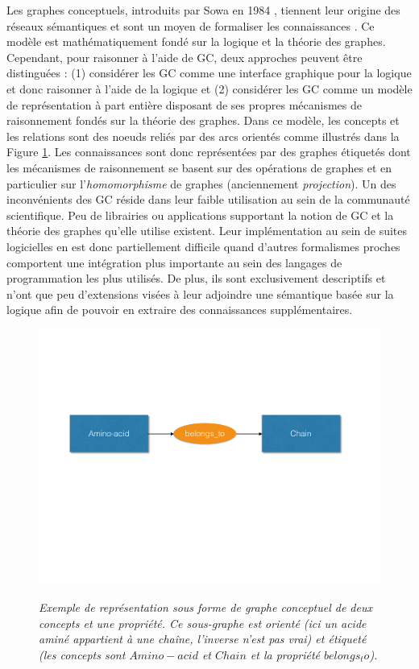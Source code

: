 Les graphes conceptuels, introduits par Sowa en 1984 \cite{sowa1983conceptual}, tiennent leur origine des réseaux sémantiques \cite{lehmann1992semantic} et sont un moyen de formaliser les connaissances \cite{chein2008graph}. Ce modèle est mathématiquement fondé sur la logique et la théorie des graphes. Cependant, pour raisonner à l'aide de GC, deux approches peuvent être distinguées : (1) considérer les GC comme une interface graphique pour la logique et donc raisonner à l’aide de la logique et (2) considérer les GC comme un modèle de représentation à part entière disposant de ses propres mécanismes de raisonnement fondés sur la théorie des graphes. Dans ce modèle, les concepts et les relations sont des noeuds reliés par des arcs orientés comme illustrés dans la Figure \ref{Fig:conceptual_graph}. Les connaissances sont donc représentées par des graphes étiquetés dont les mécanismes de raisonnement se basent sur des opérations de graphes et en particulier sur l'\textit{homomorphisme} de graphes (anciennement \textit{projection}).
Un des inconvénients des GC réside dans leur faible utilisation au sein de la communauté scientifique. Peu de librairies ou applications supportant la notion de GC et la théorie des graphes qu'elle utilise existent. Leur implémentation au sein de suites logicielles en est donc partiellement difficile quand d'autres formalismes proches comportent une intégration plus importante au sein des langages de programmation les plus utilisés. De plus, ils sont exclusivement descriptifs et n'ont que peu d'extensions visées à leur adjoindre une sémantique basée sur la logique afin de pouvoir en extraire des connaissances supplémentaires.

\begin{figure}
  \centering
  {\includegraphics[width=.6\linewidth]{./figures/ch2/conceptual_graph}}
    \caption[Exemple de représentation sous forme de graphe conceptuel de deux concepts et une propriété en Graphe Conceptuel.]{\it Exemple de représentation sous forme de graphe conceptuel de deux concepts et une propriété. Ce sous-graphe est orienté (ici un acide aminé appartient à une chaîne, l'inverse n'est pas vrai) et étiqueté (les concepts sont $Amino-acid$ et $Chain$ et la propriété $belongs_to$).}
  \label{Fig:conceptual_graph}
  \hspace{0.5cm}
\end{figure}

